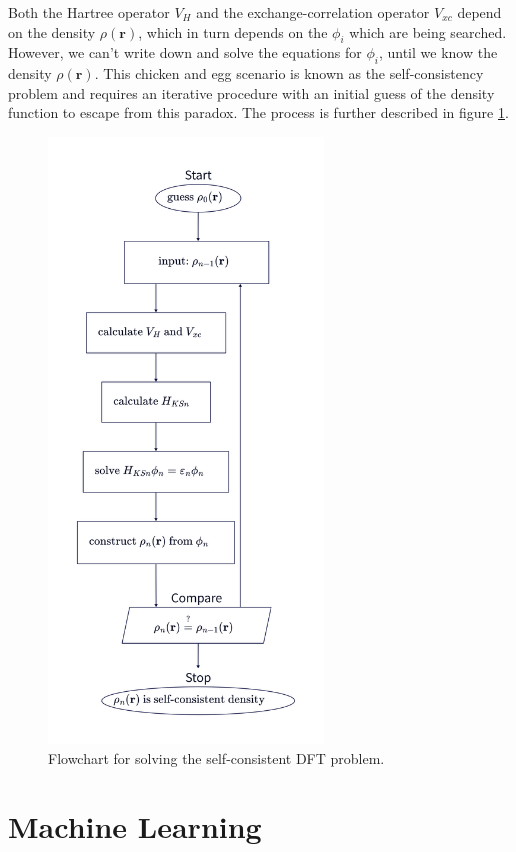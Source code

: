 Both the Hartree operator $V_H$ and the exchange-correlation operator $V_{xc}$
depend on the density $\rho(\mathbf{r})$, which in turn depends on the
$\phi_i$ which are being searched. However, we can't write down and solve the
equations for $\phi_i$, until we know the density $\rho(\mathbf{r})$. This
chicken and egg scenario is known as the self-consistency problem and requires
an iterative procedure with an initial guess of the density function to escape
from this paradox. The process is further described in figure
\ref{fig:self-consistency}.

\begin{figure}
  \begin{center}
    \includegraphics[width=7.3cm]{asset/self_consistency}
  \end{center}
  \caption{Flowchart for solving the self-consistent DFT problem.}
  \label{fig:self-consistency}
\end{figure}

\section{Machine Learning}

